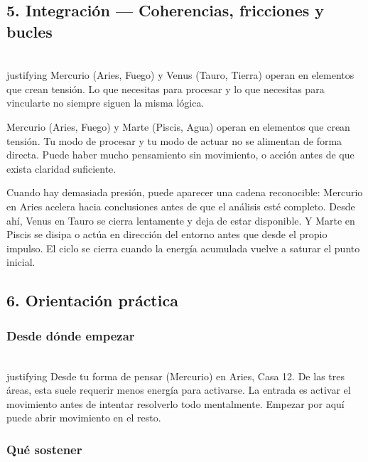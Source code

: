 \documentclass[11pt,a4paper]{article}
\begin{document}
\vspace{0.8cm}

\subsection{5. Integración — Coherencias, fricciones y bucles}

\\justifying
Mercurio (Aries, Fuego) y Venus (Tauro, Tierra) operan en elementos que crean tensión. Lo que necesitas para procesar y lo que necesitas para vincularte no siempre siguen la misma lógica.

Mercurio (Aries, Fuego) y Marte (Piscis, Agua) operan en elementos que crean tensión. Tu modo de procesar y tu modo de actuar no se alimentan de forma directa. Puede haber mucho pensamiento sin movimiento, o acción antes de que exista claridad suficiente.

Cuando hay demasiada presión, puede aparecer una cadena reconocible: Mercurio en Aries acelera hacia conclusiones antes de que el análisis esté completo. Desde ahí, Venus en Tauro se cierra lentamente y deja de estar disponible. Y Marte en Piscis se disipa o actúa en dirección del entorno antes que desde el propio impulso. El ciclo se cierra cuando la energía acumulada vuelve a saturar el punto inicial.

\vspace{0.8cm}

\subsection{6. Orientación práctica}

\subsubsection*{Desde dónde empezar}

\\justifying
Desde tu forma de pensar (Mercurio) en Aries, Casa 12. De las tres áreas, esta suele requerir menos energía para activarse. La entrada es activar el movimiento antes de intentar resolverlo todo mentalmente. Empezar por aquí puede abrir movimiento en el resto.

\subsubsection*{Qué sostener}
\end{document}
